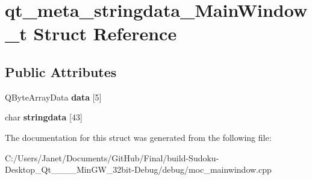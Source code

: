 \hypertarget{structqt__meta__stringdata___main_window__t}{\section{qt\-\_\-meta\-\_\-stringdata\-\_\-\-Main\-Window\-\_\-t Struct Reference}
\label{structqt__meta__stringdata___main_window__t}
}
\subsection*{Public Attributes}
\begin{DoxyCompactItemize}
\item 
\hypertarget{structqt__meta__stringdata___main_window__t_a728217305ebd7d8895235c2038c4ed28}{Q\-Byte\-Array\-Data {\bfseries data} \mbox{[}5\mbox{]}}\label{structqt__meta__stringdata___main_window__t_a728217305ebd7d8895235c2038c4ed28}

\item 
\hypertarget{structqt__meta__stringdata___main_window__t_a308c2ea0257b1ad83ad81c262035d8a6}{char {\bfseries stringdata} \mbox{[}43\mbox{]}}\label{structqt__meta__stringdata___main_window__t_a308c2ea0257b1ad83ad81c262035d8a6}

\end{DoxyCompactItemize}


The documentation for this struct was generated from the following file\-:\begin{DoxyCompactItemize}
\item 
C\-:/\-Users/\-Janet/\-Documents/\-Git\-Hub/\-Final/build-\/\-Sudoku-\/\-Desktop\-\_\-\-Qt\-\_\-\_\-\_\-\_\-\-Min\-G\-W\-\_\-32bit-\/\-Debug/debug/moc\-\_\-mainwindow.\-cpp\end{DoxyCompactItemize}

